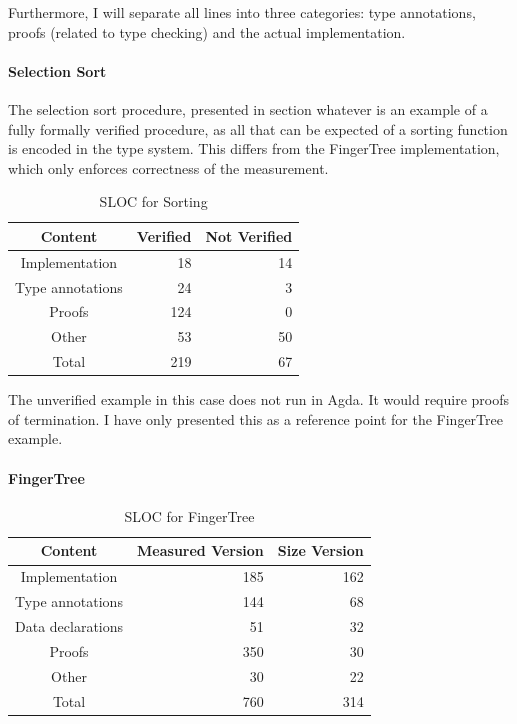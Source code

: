 \documentclass[12pt,twoside,notitlepage]{report}
\begin{document}
Furthermore, I will separate all lines into three categories: type annotations, proofs (related to type checking) and the actual implementation.

\paragraph{Selection Sort}

The selection sort procedure, presented in section whatever is an example of a fully formally verified procedure, as all that can be expected of a sorting function is encoded in the type system. This differs from the FingerTree implementation, which only enforces correctness of the measurement.

\begin{table}[H]
\caption{SLOC for Sorting}
\center
\begin{tabular}{c r r}
\hline
Content & Verified & Not Verified\\
\hline
Implementation & 18 & 14 \\
Type annotations & 24 & 3 \\
Proofs & 124 & 0 \\
Other & 53 & 50 \\
Total & 219 & 67 \\
\hline
\end{tabular} 
\end{table}

The unverified example in this case does not run in Agda. It would require proofs of termination. I have only presented this as a reference point for the FingerTree example.

\paragraph{FingerTree}

\begin{table}[H]
\caption{SLOC for FingerTree}
\center
\begin{tabular}{c r r}
\hline 
Content & Measured Version & Size Version \\
\hline
Implementation & 185 & 162 \\ 
Type annotations & 144 & 68 \\
Data declarations & 51 & 32 \\
Proofs & 350 & 30 \\
Other & 30 & 22 \\ 
Total & 760 & 314 \\
\hline
\end{tabular}
\end{table} 
\end{document}
